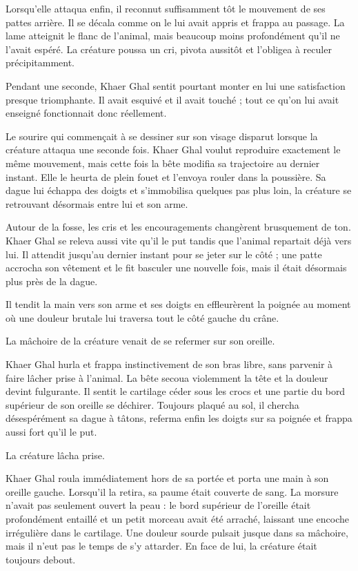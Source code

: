 Lorsqu'elle attaqua enfin, il reconnut suffisamment tôt le mouvement de ses
pattes arrière. Il se décala comme on le lui avait appris et frappa au passage.
La lame atteignit le flanc de l'animal, mais beaucoup moins profondément qu'il
ne l'avait espéré. La créature poussa un cri, pivota aussitôt et l'obligea à
reculer précipitamment.

Pendant une seconde, Khaer Ghal sentit pourtant monter en lui une satisfaction
presque triomphante. Il avait esquivé et il avait touché ; tout ce qu'on lui
avait enseigné fonctionnait donc réellement.

Le sourire qui commençait à se dessiner sur son visage disparut lorsque la
créature attaqua une seconde fois. Khaer Ghal voulut reproduire exactement le
même mouvement, mais cette fois la bête modifia sa trajectoire au dernier
instant. Elle le heurta de plein fouet et l'envoya rouler dans la poussière. Sa
dague lui échappa des doigts et s'immobilisa quelques pas plus loin, la
créature se retrouvant désormais entre lui et son arme.

Autour de la fosse, les cris et les encouragements changèrent brusquement de
ton. Khaer Ghal se releva aussi vite qu'il le put tandis que l'animal repartait
déjà vers lui. Il attendit jusqu'au dernier instant pour se jeter sur le côté ;
une patte accrocha son vêtement et le fit basculer une nouvelle fois, mais il
était désormais plus près de la dague.

Il tendit la main vers son arme et ses doigts en effleurèrent la poignée au
moment où une douleur brutale lui traversa tout le côté gauche du crâne.

La mâchoire de la créature venait de se refermer sur son oreille.

Khaer Ghal hurla et frappa instinctivement de son bras libre, sans parvenir à
faire lâcher prise à l'animal. La bête secoua violemment la tête et la douleur
devint fulgurante. Il sentit le cartilage céder sous les crocs et une partie du
bord supérieur de son oreille se déchirer. Toujours plaqué au sol, il chercha
désespérément sa dague à tâtons, referma enfin les doigts sur sa poignée et
frappa aussi fort qu'il le put.

La créature lâcha prise.

Khaer Ghal roula immédiatement hors de sa portée et porta une main à son
oreille gauche. Lorsqu'il la retira, sa paume était couverte de sang. La
morsure n'avait pas seulement ouvert la peau : le bord supérieur de l'oreille
était profondément entaillé et un petit morceau avait été arraché, laissant une
encoche irrégulière dans le cartilage. Une douleur sourde pulsait jusque dans
sa mâchoire, mais il n'eut pas le temps de s'y attarder. En face de lui, la
créature était toujours debout.

